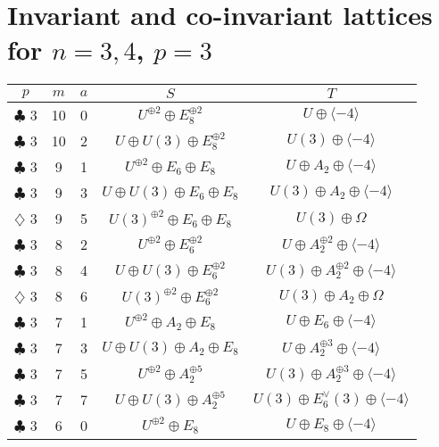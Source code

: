 \documentclass{amsart}
\theoremstyle{definition}
\begin{document}
\appendix
\section{Invariant and co-invariant lattices for $n=3,4$, $p=3$} \label{appendix: tables}

\begin{table}[h]
 \begin{tabular}{c|c|c|c|c}
 $p$&$m$&$a$&$S$&$T$\\
 \hline
  $\clubsuit$ 3&10&0&$U^{\oplus 2}\oplus E_8^{\oplus 2}$&$U\oplus \langle -4\rangle$\\
 
 $\clubsuit$ 3&10&2&$U\oplus U(3)\oplus E_8^{\oplus 2}$&$U(3)\oplus\langle -4\rangle$\\
 \hline
 
$\clubsuit$ 3&9&1&$U^{\oplus 2}\oplus E_6\oplus E_8$&$U\oplus A_2\oplus \langle -4\rangle$\\
 
 $\clubsuit$ 3&9&3&$U\oplus U(3)\oplus E_6\oplus E_8$&$U(3)\oplus A_2\oplus \langle -4\rangle$\\
 
 $\diamondsuit$ 3&9&5&$U(3)^{\oplus 2}\oplus E_6\oplus E_8$& $U(3) \oplus \Omega$\\

 \hline
 
 $\clubsuit$ 3&8&2&$U^{\oplus 2}\oplus E_6^{\oplus 2}$&$U\oplus A_2^{\oplus 2}\oplus \langle -4\rangle$\\
 
 $\clubsuit$ 3&8&4&$U\oplus U(3)\oplus E_6^{\oplus 2}$&$U(3)\oplus A_2^{\oplus 2}\oplus \langle -4\rangle$\\
 
 $\diamondsuit$ 3&8&6&$U(3)^{\oplus 2}\oplus E_6^{\oplus 2}$& $U(3) \oplus A_2 \oplus \Omega$\\

 \hline
 
 $\clubsuit$ 3&7&1&$ U^{\oplus 2} \oplus A_2 \oplus E_8 $&$U\oplus E_6\oplus \langle -4\rangle$\\
 
 $\clubsuit$ 3&7&3& $U\oplus U(3)\oplus A_2\oplus E_8$&$U\oplus A_2^{\oplus 3}\oplus \langle -4\rangle$\\
 
 $\clubsuit$ 3&7&5&$U^{\oplus 2}\oplus A_2^{\oplus 5}$&$U(3)\oplus A_2^{\oplus 3}\oplus \langle -4\rangle$\\
 
 $\clubsuit$ 3&7&7&$U\oplus U(3)\oplus A_2^{\oplus 5}$&$U(3)\oplus E_6^\vee(3)\oplus \langle -4\rangle$\\
 \hline
 $\clubsuit$ 3&6&0&$U^{\oplus 2}\oplus E_8$&$U\oplus E_8\oplus \langle -4\rangle$\\
 

\end{tabular}
\end{table}
\end{document}
